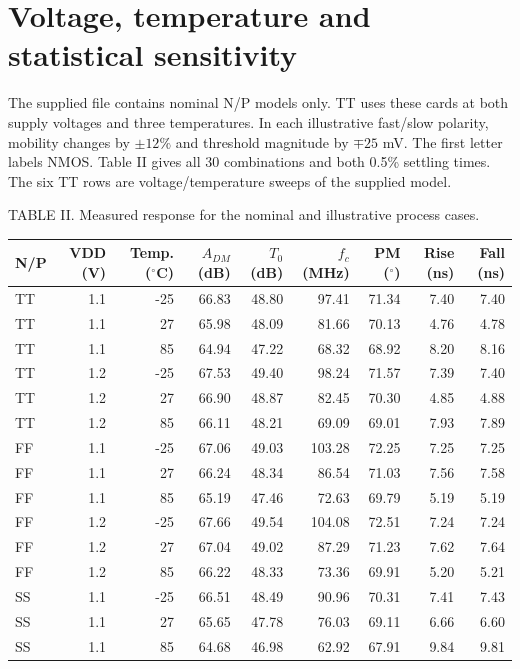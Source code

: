 \documentclass[10pt,journal]{IEEEtran}
\begin{document}
\section{Voltage, temperature and statistical sensitivity}\label{sec:var}
The supplied file contains nominal N/P models only. TT uses these cards at both supply voltages and three temperatures. In each illustrative fast/slow polarity, mobility changes by $\pm12\%$ and threshold magnitude by $\mp25$ mV. The first letter labels NMOS. Table II gives all 30 combinations and both 0.5\% settling times. The six TT rows are voltage/temperature sweeps of the supplied model.
\begin{center}
TABLE II. Measured response for the nominal and illustrative process cases.\\[4pt]
\begin{tabular}{@{}lrrrrrrrr@{}}\toprule
N/P & VDD (V) & Temp. ($^\circ$C) & $A_{DM}$ (dB) & $T_0$ (dB) & $f_c$ (MHz) & PM ($^\circ$) & Rise (ns) & Fall (ns) \\ \midrule
TT & 1.1 & -25 & 66.83 & 48.80 & 97.41 & 71.34 & 7.40 & 7.40 \\
TT & 1.1 & 27 & 65.98 & 48.09 & 81.66 & 70.13 & 4.76 & 4.78 \\
TT & 1.1 & 85 & 64.94 & 47.22 & 68.32 & 68.92 & 8.20 & 8.16 \\
TT & 1.2 & -25 & 67.53 & 49.40 & 98.24 & 71.57 & 7.39 & 7.40 \\
TT & 1.2 & 27 & 66.90 & 48.87 & 82.45 & 70.30 & 4.85 & 4.88 \\
TT & 1.2 & 85 & 66.11 & 48.21 & 69.09 & 69.01 & 7.93 & 7.89 \\
FF & 1.1 & -25 & 67.06 & 49.03 & 103.28 & 72.25 & 7.25 & 7.25 \\
FF & 1.1 & 27 & 66.24 & 48.34 & 86.54 & 71.03 & 7.56 & 7.58 \\
FF & 1.1 & 85 & 65.19 & 47.46 & 72.63 & 69.79 & 5.19 & 5.19 \\
FF & 1.2 & -25 & 67.66 & 49.54 & 104.08 & 72.51 & 7.24 & 7.24 \\
FF & 1.2 & 27 & 67.04 & 49.02 & 87.29 & 71.23 & 7.62 & 7.64 \\
FF & 1.2 & 85 & 66.22 & 48.33 & 73.36 & 69.91 & 5.20 & 5.21 \\
SS & 1.1 & -25 & 66.51 & 48.49 & 90.96 & 70.31 & 7.41 & 7.43 \\
SS & 1.1 & 27 & 65.65 & 47.78 & 76.03 & 69.11 & 6.66 & 6.60 \\
SS & 1.1 & 85 & 64.68 & 46.98 & 62.92 & 67.91 & 9.84 & 9.81 \\

\end{tabular}
\end{center}
\end{document}
